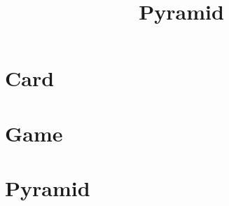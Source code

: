 \documentclass{article}
\begin{document}
\title{Pyramid}
\author{}
\maketitle
\tableofcontents

\section{Card}

\section{Game}

\section{Pyramid}

\end{document}

